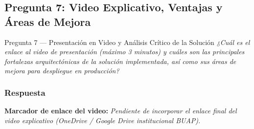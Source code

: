 \documentclass[11pt,a4paper]{article}
\begin{document}
\subsection{Pregunta 7: Video Explicativo, Ventajas y Áreas de Mejora}

\begin{pregunta}{Pregunta 7 --- Presentación en Video y Análisis Crítico de la Solución}{}
\textit{¿Cuál es el enlace al video de presentación (máximo 3 minutos) y cuáles son las principales fortalezas arquitectónicas de la solución implementada, así como sus áreas de mejora para despliegue en producción?}
\end{pregunta}

\subsubsection*{Respuesta}

\begin{tcolorbox}[
    enhanced,
    colback=white,
    colframe=fccorange,
    coltitle=white,
    fonttitle=\bfseries,
    title={Enlace al Video Explicativo (Duración máxima: 3 minutos)},
    boxed title style={colback=fccorange,arc=1.5mm},
    arc=2mm
]
\centering
\textbf{Marcador de enlace del video:} \textit{Pendiente de incorporar el enlace final del video explicativo (OneDrive / Google Drive institucional BUAP).}
\end{tcolorbox}
\end{document}
